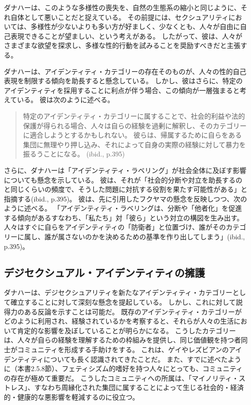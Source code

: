 \documentclass[paper=a4,book,openany]{jlreq} \usepackage{mystyle}
\begin{document}
ダナハーは、このような多様性の喪失を、自然の生態系の縮小と同じように、それ自体として悪いことだと捉えている。
その前提には、セクシュアリティにおいては、多様性が少ないよりも多い方が好ましく、少なくとも、人々が自由に自己表現できることが望ましい、という考えがある。
したがって、彼は、人々がさまざまな欲望を探求し、多様な性的行動を試みることを奨励すべきだと主張する。

ダナハーは、アイデンティティ・カテゴリーの存在そのものが、人々の性的自己表現を制限する傾向を助長すると懸念している。
しかし、彼はさらに、特定のアイデンティティを採用することに利点が伴う場合、この傾向が一層強まると考えている。
彼は次のように述べる。

\begin{quote}
特定のアイデンティティ・カテゴリーに属することで、社会的利益や法的保護が得られる場合、人々は自らの経験を過剰に解釈し、そのカテゴリーに適合しようとするかもしれない。
彼らは、帰属するために自らをある集団に無理やり押し込み、それによって自身の実際の経験に対して暴力を振るうことになる。
(ibid., p.395)

\end{quote}

さらに、ダナハーは「アイデンティティ・ラベリング」が社会全体に及ぼす影響についても懸念を示している。
彼は、それが「社会的分断や対立を助長するのと同じくらいの頻度で、そうした問題に対抗する役割を果たす可能性がある」と指摘する(ibid., p.395)。
彼は、先に引用したフクヤマの懸念を反映しつつ、次のように述べる。
「アイデンティティ・ラベリングは、分断や「他者化」を促進する傾向がある{\DDASH}すなわち、「私たち」対「彼ら」という対立の構図を生み出す。
人々はすぐに自らをアイデンティティの「防衛者」と位置づけ、誰がそのカテゴリーに属し、誰が属さないのかを決めるための基準を作り出してしまう」(ibid., p.395)。

\subsection{デジセクシュアル・アイデンティティの擁護}

ダナハーは、デジセクシュアリティを新たなアイデンティティ・カテゴリーとして確立することに対して深刻な懸念を提起している。
しかし、これに対して説得力のある反論を示すことは可能だ。
既存のアイデンティティ・カテゴリーがどのように利用され、経験されているかを考察すると、それらが人々の生活において肯定的な影響を及ぼしていることが明らかになる。
こうしたカテゴリーは、人々が自らの経験を理解するための枠組みを提供し、同じ価値観を持つ者同士がコミュニティを形成する手助けをする。
これは、ゲイやレズビアンのアイデンティティについても長く認識されてきたことだ。
また、すでに述べたように（本書2.5.8節）、フェティシズム的嗜好を持つ人々にとっても、コミュニティの存在が極めて重要だ。
こうしたコミュニティへの所属は、「マイノリティ・ストレス」、すなわち周縁化された集団に属することによって生じる社会的・経済的・健康的な悪影響を軽減するのに役立つ\citep{salfas19:_what_is_role_commun}。
\end{document}

